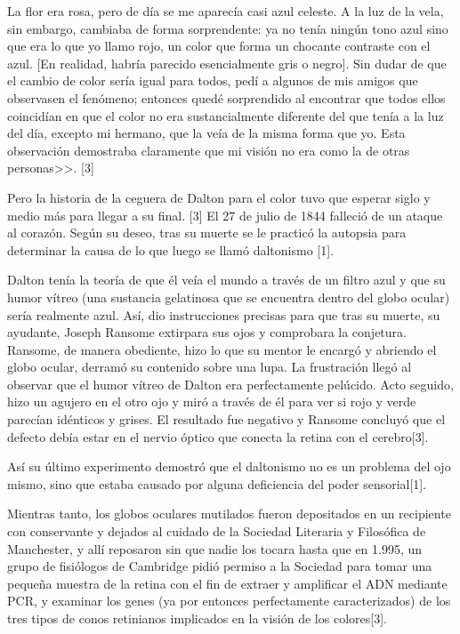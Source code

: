 \documentclass[10pt]{article}
\begin{document}
\setlength{\parskip}{2mm}

La flor era rosa, pero de día se me aparecía casi azul celeste. A la luz de la vela, sin embargo, cambiaba de forma sorprendente: ya no tenía ningún tono azul sino que era lo que yo llamo rojo, un color que forma un chocante contraste con el azul. [En realidad, habría parecido esencialmente gris o negro]. Sin dudar de que el cambio de color sería igual para todos, pedí a algunos de mis amigos que observasen el fenómeno; entonces quedé sorprendido al encontrar que todos ellos coincidían en que el color no era sustancialmente diferente del que tenía a la luz del día, excepto mi hermano, que la veía de la misma forma que yo. Esta observación demostraba claramente que mi visión no era como la de otras personas>>.  [3]

\setlength{\parskip}{2mm}

Pero la historia de la ceguera de Dalton para el color tuvo que esperar siglo y medio más para llegar a su final. [3]
El 27 de julio de 1844 falleció de un ataque al corazón. Según su deseo, tras su muerte se le practicó la autopsia para determinar la causa de lo que luego se llamó daltonismo [1].

\setlength{\parskip}{2mm}

Dalton tenía la teoría de que él veía el mundo a través de un filtro azul y que su humor vítreo (una sustancia gelatinosa que se encuentra dentro del globo ocular) sería realmente azul. Así, dio instrucciones precisas para que tras su muerte, su ayudante, Joseph Ransome extirpara sus ojos y comprobara la conjetura. Ransome, de manera obediente, hizo lo que su mentor le encargó y abriendo el globo ocular, derramó su contenido sobre una lupa. La frustración llegó al observar que el humor vítreo de Dalton era perfectamente pelúcido. Acto seguido, hizo un agujero en el otro ojo y miró a través de él para ver si rojo y verde parecían idénticos y grises. El resultado fue negativo y Ransome concluyó que el defecto debía estar en el nervio óptico que conecta la retina con el cerebro[3].

\setlength{\parskip}{2mm}

Así su último experimento demostró que el daltonismo no es un problema del ojo mismo, sino que estaba causado por alguna deficiencia del poder sensorial[1].

\setlength{\parskip}{2mm}

Mientras tanto, los globos oculares mutilados fueron depositados en un recipiente con conservante y dejados al cuidado de la Sociedad Literaria y Filosófica de Manchester, y allí reposaron sin que nadie los tocara hasta que en 1.995, un grupo de fisiólogos de Cambridge pidió permiso a la Sociedad para tomar una pequeña muestra de la retina con el fin de extraer y amplificar el ADN mediante PCR, y examinar los genes (ya por entonces perfectamente caracterizados) de los tres tipos de conos retinianos implicados en la visión de los colores[3].
\end{document}
